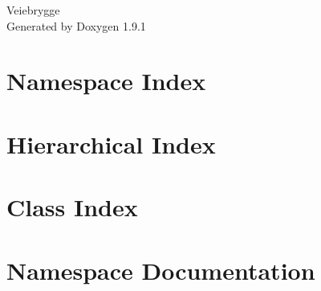\let\mypdfximage\pdfximage\def\pdfximage{\immediate\mypdfximage}\documentclass[twoside]{book}
\newcommand{\+}{\discretionary{\mbox{\scriptsize$\hookleftarrow$}}{}{}}
\newcommand{\clearemptydoublepage}{%
  \newpage{\pagestyle{empty}\cleardoublepage}%
}
\begin{document}
\raggedbottom

\hypersetup{pageanchor=false,
             bookmarksnumbered=true,
             pdfencoding=unicode
            }
\begin{titlepage}
\vspace*{7cm}
\begin{center}%
{\Large Veiebrygge }\\
\vspace*{1cm}
{\large Generated by Doxygen 1.9.1}\\
\end{center}
\end{titlepage}
\clearemptydoublepage
{}
\tableofcontents
\clearemptydoublepage
{}
\hypersetup{pageanchor=true}

\chapter{Namespace Index}

\chapter{Hierarchical Index}

\chapter{Class Index}

\chapter{Namespace Documentation}


\end{document}
